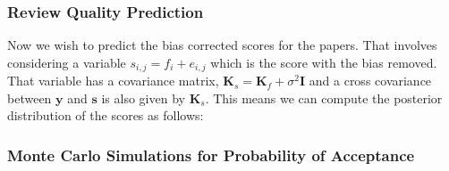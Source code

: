 \begin{Shaded}
\begin{Highlighting}[]
\OperatorTok{=} \OperatorTok{*}\OperatorTok{*}\OperatorTok{*}\OperatorTok{*}\OperatorTok{+} \OperatorTok{*}\OperatorTok{+} \OperatorTok{*}\OperatorTok{/}
\NormalTok{(}
\end{Highlighting}
\end{Shaded}

\hypertarget{review-quality-prediction}{%
\subsubsection{Review Quality
Prediction}\label{review-quality-prediction}}

\begin{flushright}
\end{flushright}

Now we wish to predict the bias corrected scores for the papers. That
involves considering a variable \(s_{i,j} = f_i + e_{i,j}\) which is the
score with the bias removed. That variable has a covariance matrix,
\(\mathbf{K}_s=\mathbf{K}_f + \sigma^2 \mathbf{I}\) and a cross
covariance between \(\mathbf{y}\) and \(\mathbf{s}\) is also given by
\(\mathbf{K}_s\). This means we can compute the posterior distribution
of the scores as follows:

\begin{Shaded}
\begin{Highlighting}[]
\OperatorTok{=}\OperatorTok{+}\NormalTok{ np.eye(K\_f.shape[}\NormalTok{])}\OperatorTok{*}
\OperatorTok{=}\OperatorTok{+}\OperatorTok{=}
\OperatorTok{=}\OperatorTok{*}\OperatorTok{{-}}
\end{Highlighting}
\end{Shaded}

\hypertarget{monte-carlo-simulations-for-probability-of-acceptance}{%
\subsubsection{Monte Carlo Simulations for Probability of
Acceptance}\label{monte-carlo-simulations-for-probability-of-acceptance}}


